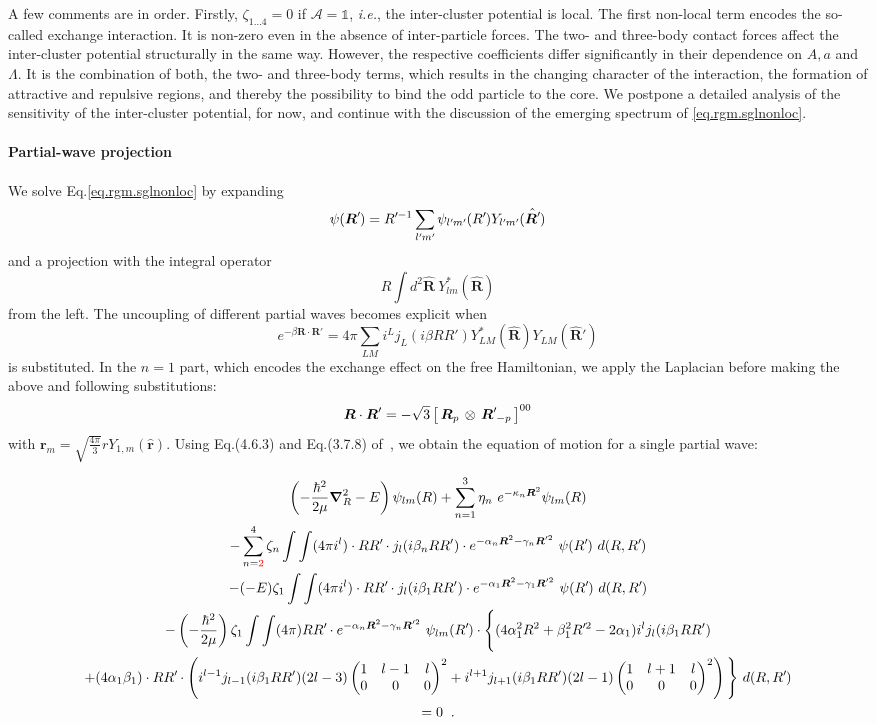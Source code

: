 \documentclass[aps,nofootinbib,prl,showpacs,twocolumn,groupedaddress,superscriptaddress]
{revtex4}
\newcommand*{\mprime}{^{\prime}\mkern-1.2mu}
\newcommand{\red}[1]{\textcolor{red}{#1}}
\newcommand{\be}{\begin{equation}}
\newcommand{\ee}{\end{equation}}
\newcommand{\ie}{\textit{i.e.}\;}
\newcommand{\ve}[1]{\ensuremath{\boldsymbol{#1}}}
\newcommand{\coup}[3]{\left[\,#1\,\otimes\,#2\,\right]^{#3}}
\newcommand{\threej}[6]{ \begin{pmatrix}
   #1 & #2 & #3 \\
   #4 & #5 & #6 
  \end{pmatrix}}
\begin{document}
A few comments are in order. Firstly, $\zeta_{1\ldots4}=0$ if $\mathcal{A}=\mathbb{1}$, \ie, the
inter-cluster potential is local. The first non-local term encodes the so-called exchange interaction.
It is non-zero even in the absence of inter-particle forces. The two- and three-body
contact forces affect the inter-cluster potential structurally in the same way. However, the respective
coefficients differ significantly in their dependence on $A,a$ and $\Lambda$. It is the combination
of both, the two- and three-body terms, which results in the changing character of the interaction,
the formation of attractive and repulsive regions, and thereby the possibility to bind the odd particle
to the core. We postpone a detailed analysis of the sensitivity of the inter-cluster potential,
for now, and continue with the discussion of the emerging spectrum of \eqref{eq.rgm.sglnonloc}.

\paragraph{Partial-wave projection} We solve Eq.\eqref{eq.rgm.sglnonloc} by expanding
\be
\psi(\ve{R}\mprime)=R\mprime^{-1}\sum_{l\mprime m\mprime}\psi_{l\mprime m\mprime}(R\mprime)Y_{l\mprime m\mprime}(\hat{\ve{R}\mprime})
\ee
and a projection with the integral operator
\be
R\int d^2\hat{\ve{R}}~Y^*_{lm}(\hat{\ve{R}})
\ee
from the left. The uncoupling of different partial waves becomes explicit when
\be
e^{-\beta\ve{R}\cdot\ve{R}'}=4\pi\sum_{LM}i^Lj_L(i\beta RR')Y^*_{LM}(\hat{\ve{R}})Y_{LM}(\hat{\ve{R}}')
\ee
is substituted. In the $n=1$ part, which encodes the exchange effect on the free
Hamiltonian, we apply the Laplacian before making the above and following
substitutions:
\be
\ve{R}\cdot\ve{R}'=-\sqrt{3}\coup{\ve{R}_p}{\ve{R}\mprime_{-p}}{00}
\ee
with $\ve{r}_m=\sqrt{\frac{4\pi}{3}}rY_{1,m}(\hat{\ve{r}})$. Using Eq.(4.6.3) and
Eq.(3.7.8) of~\cite{Edmonds}, we obtain the equation of motion for a single
partial wave:
\begin{widetext}
\begin{gather}\label{eq.rgm.sglnonloc.pw}
\left(-\frac{\hbar^2}{2\mu}\ve{\nabla}_R^2-E\right)\psi_{lm}(R)+
\sum_{n=1}^3\eta_n~e^{-\kappa_n\ve{R}^2}\psi_{lm}(R)\\
-\sum_{n=\red{2}}^4\zeta_n\int\int
(4\pi i^l)\cdot RR\mprime\cdot j_l(i\beta_n RR')\cdot e^{-\alpha_n\ve{R}^2-\gamma_n\ve{R}'^2}~\psi(R\mprime)~d(R,R\mprime)\\
-(-E)\zeta_1\int\int
(4\pi i^l)\cdot RR\mprime\cdot j_l(i\beta_1 RR')\cdot e^{-\alpha_1\ve{R}^2-\gamma_1\ve{R}'^2}~\psi(R\mprime)~d(R,R\mprime)\\
-\left(-\frac{\hbar^2}{2\mu}\right)\zeta_1\int\int
(4\pi) RR\mprime\cdot e^{-\alpha_n\ve{R}^2-\gamma_n\ve{R}'^2}~\psi_{lm}(R\mprime)
\cdot\Bigg\lbrace
(4\alpha_1^2R^2+\beta_1^2R\mprime^2-2\alpha_1) i^l j_{l}(i\beta_1 RR')\\
+
(4\alpha_1\beta_1)\cdot RR\mprime\cdot
 \left(i^{l-1} j_{l-1}(i\beta_1 RR') (2l-3)
 \threej{1}{l-1}{l}{0}{0}{0}^2+
 i^{l+1} j_{l+1}(i\beta_1 RR') (2l-1)
 \threej{1}{l+1}{l}{0}{0}{0}^2\right)\Bigg\rbrace
~d(R,R\mprime)\\=0\;\;.
\end{gather}
\end{widetext}
\end{document}

